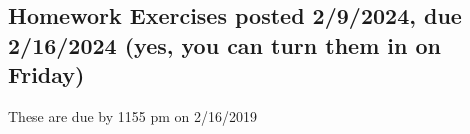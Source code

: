 \documentclass[12pt]{article}
\begin{document}
\begin{comment}
\item[Goal:]  $P \vee R$

\begin{description}

\item[Case IIa (on (3)):  assume (3a):]  $Q$

\item[Goal:]  $P \vee R$

\item[(4):]  $\perp$ by (2b)(3a) contradiction

\item[conclusion of case IIa:]  $P \vee R$ by (4) (anything follows from a contradiction)

\item[Case IIb (on (3)) assume (3b):]  $R$

\item[Goal:]  $P \vee R$

\item[conclusion of case IIb:]  $P \vee R$  by weakening from (3b) and this is our goal.



\end{description}

\end{description}
\end{description}

\end{description}

Notice the nested proofs by cases in this example.  The last homework problem has two parts similarly related -- prove using any rules, then prove using only the positive rules for disjunction.

\end{comment}

\subsection{Homework Exercises posted 2/9/2024, due 2/16/2024 (yes, you can turn them in on Friday)}

These are due by 1155 pm on  2/16/2019 
\end{document}

